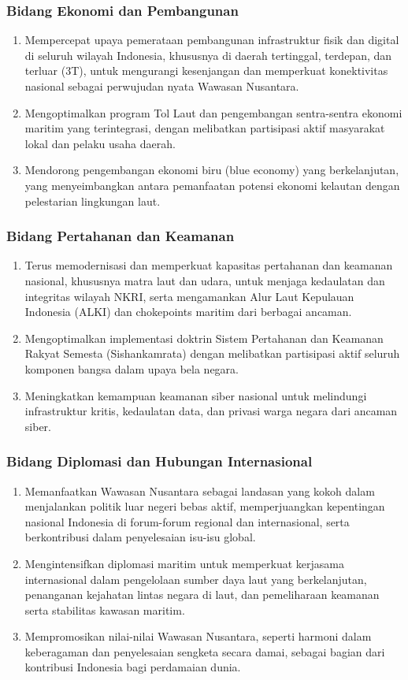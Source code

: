 \documentclass[12pt, a4paper]{article}
\begin{document}
\subsubsection*{Bidang Ekonomi dan Pembangunan}
\begin{enumerate}
  \item Mempercepat upaya pemerataan pembangunan infrastruktur fisik dan digital di seluruh wilayah Indonesia, khususnya di daerah tertinggal, terdepan, dan terluar (3T), untuk mengurangi kesenjangan dan memperkuat konektivitas nasional sebagai perwujudan nyata Wawasan Nusantara.
  \item Mengoptimalkan program Tol Laut dan pengembangan sentra-sentra ekonomi maritim yang terintegrasi, dengan melibatkan partisipasi aktif masyarakat lokal dan pelaku usaha daerah.
  \item Mendorong pengembangan ekonomi biru (blue economy) yang berkelanjutan, yang menyeimbangkan antara pemanfaatan potensi ekonomi kelautan dengan pelestarian lingkungan laut.
\end{enumerate}
\subsubsection*{Bidang Pertahanan dan Keamanan}
\begin{enumerate}
  \item Terus memodernisasi dan memperkuat kapasitas pertahanan dan keamanan nasional, khususnya matra laut dan udara, untuk menjaga kedaulatan dan integritas wilayah NKRI, serta mengamankan Alur Laut Kepulauan Indonesia (ALKI) dan chokepoints maritim dari berbagai ancaman.
  \item Mengoptimalkan implementasi doktrin Sistem Pertahanan dan Keamanan Rakyat Semesta (Sishankamrata) dengan melibatkan partisipasi aktif seluruh komponen bangsa dalam upaya bela negara.
  \item Meningkatkan kemampuan keamanan siber nasional untuk melindungi infrastruktur kritis, kedaulatan data, dan privasi warga negara dari ancaman siber.
\end{enumerate}

\subsubsection*{Bidang Diplomasi dan Hubungan Internasional}
\begin{enumerate}
  \item Memanfaatkan Wawasan Nusantara sebagai landasan yang kokoh dalam menjalankan politik luar negeri bebas aktif, memperjuangkan kepentingan nasional Indonesia di forum-forum regional dan internasional, serta berkontribusi dalam penyelesaian isu-isu global.
  \item Mengintensifkan diplomasi maritim untuk memperkuat kerjasama internasional dalam pengelolaan sumber daya laut yang berkelanjutan, penanganan kejahatan lintas negara di laut, dan pemeliharaan keamanan serta stabilitas kawasan maritim.
  \item Mempromosikan nilai-nilai Wawasan Nusantara, seperti harmoni dalam keberagaman dan penyelesaian sengketa secara damai, sebagai bagian dari kontribusi Indonesia bagi perdamaian dunia.
\end{enumerate}
\end{document}
